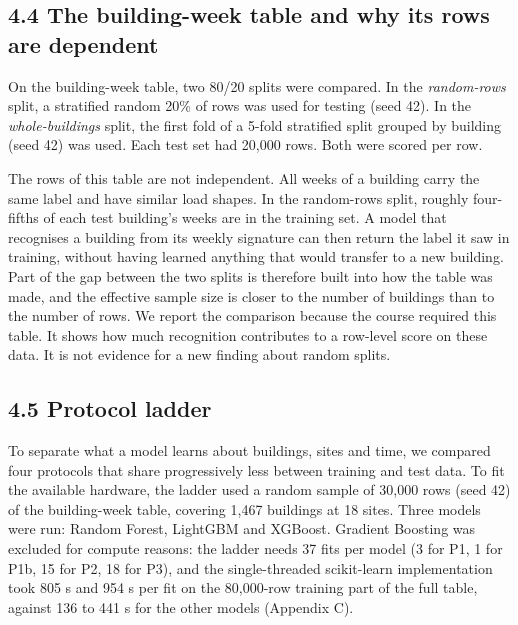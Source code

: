 \documentclass[
  10pt,
]{article}
\begin{document}
\hypertarget{the-building-week-table-and-why-its-rows-are-dependent}{%
\subsection{4.4 The building-week table and why its rows are
dependent}\label{the-building-week-table-and-why-its-rows-are-dependent}}

On the building-week table, two 80/20 splits were compared. In the
\emph{random-rows} split, a stratified random 20\% of rows was used for
testing (seed 42). In the \emph{whole-buildings} split, the first fold
of a 5-fold stratified split grouped by building (seed 42) was used.
Each test set had 20,000 rows. Both were scored per row.

The rows of this table are not independent. All weeks of a building
carry the same label and have similar load shapes. In the random-rows
split, roughly four-fifths of each test building's weeks are in the
training set. A model that recognises a building from its weekly
signature can then return the label it saw in training, without having
learned anything that would transfer to a new building. Part of the gap
between the two splits is therefore built into how the table was made,
and the effective sample size is closer to the number of buildings than
to the number of rows. We report the comparison because the course
required this table. It shows how much recognition contributes to a
row-level score on these data. It is not evidence for a new finding
about random splits.

\hypertarget{protocol-ladder}{%
\subsection{4.5 Protocol ladder}\label{protocol-ladder}}

To separate what a model learns about buildings, sites and time, we
compared four protocols that share progressively less between training
and test data. To fit the available hardware, the ladder used a random
sample of 30,000 rows (seed 42) of the building-week table, covering
1,467 buildings at 18 sites. Three models were run: Random Forest,
LightGBM and XGBoost. Gradient Boosting was excluded for compute
reasons: the ladder needs 37 fits per model (3 for P1, 1 for P1b, 15 for
P2, 18 for P3), and the single-threaded scikit-learn implementation took
805 s and 954 s per fit on the 80,000-row training part of the full
table, against 136 to 441 s for the other models (Appendix C).
\end{document}
